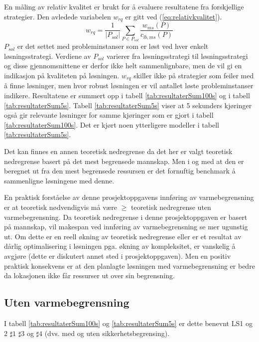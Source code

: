 En måling av relativ kvalitet er brukt for å evaluere resultatene fra forskjellige strategier. Den avledede variabelen $w_{rq}$ er gitt ved (\ref{eq:relativkvalitet}).
\begin{equation}
w_{rq} = \frac{1}{| P_{sol} |} \sum_{P \in P_{sol}} \frac{w_{ms}(P)}{c_{lb,ms}(P)}
\label{eq:relativkvalitet}
\end{equation}
$P_{sol}$ er det settet med probleminstanser som er løst ved hver enkelt løsningsstrategi. Verdiene av $P_{sol}$ varierer fra løsningsstrategi til løsningsstrategi og disse gjennomsnittene er derfor ikke helt sammenlignbare, men de vil gi en indikasjon på kvaliteten på løsningen. $w_{rq}$ skiller ikke på strategier som feiler med å finne løsninger, men hvor robust løsningen er vil antallet løste probleminstanser indikere. Resultatene er summert opp i tabell \ref{tab:resultaterSum100s} og i tabell \ref{tab:resultaterSum5s}. Tabell \ref{tab:resultaterSum5s} viser at 5 sekunders kjøringer også gir relevante løsninger for samme kjøringer som er gjort i tabell \ref{tab:resultaterSum100s}. Det er kjørt noen ytterligere modeller i tabell \ref{tab:resultaterSum5s}.

Det kan finnes en annen teoretisk nedregrense da det her er valgt teoretisk nedregrense basert på det mest begrensede mannskap. Men i og med at den er beregnet ut fra den mest begrensede ressursen er det fornuftig benchmark å sammenligne løsningene med denne.

En praktisk forståelse av denne prosjektoppgavens innføring av varmebegrensning er at teoretisk nødvendigvis må være $\ge$ teoretisk nedregrense uten varmebegrensning. Da teoretisk nedregrense i denne prosjektoppgaven er basert på mannskap, vil makespan ved innføring av varmebegrensning se mer ugunstig ut. Om dette er en reell økning av teoretisk nedregrense eller er et resultat av dårlig optimalisering i løsningen pga. økning av kompleksitet, er vanskelig å avgjøre (dette er diskutert annet sted i prosjektoppgaven). Men en positiv praktisk konsekvens er at den planlagte løsningen med varmebegrensning er bedre da lokasjonen ikke får ressurser ut over sin begrensning.

\subsection{Uten varmebegrensning}
I tabell \ref{tab:resultaterSum100s} og \ref{tab:resultaterSum5s} er dette benevnt LS1 og 2 $\sharp 1$ $\sharp 3$ og $\sharp 4$ (dvs. med og uten sikkerhetsbegrensing).

